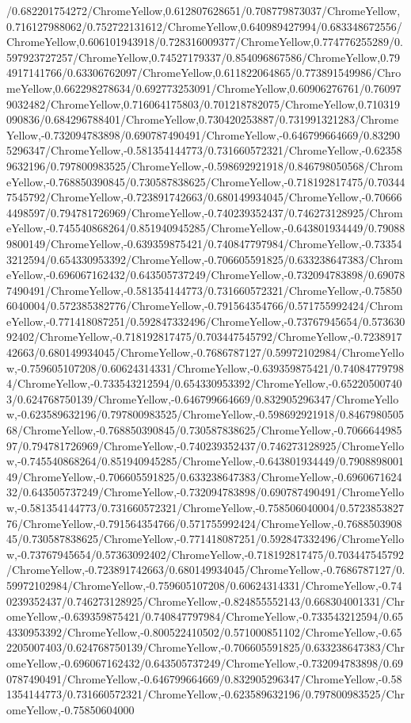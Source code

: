 {\begin{tikzternal}
{/0.682201754272/ChromeYellow,0.612807628651/0.708779873037/ChromeYellow,0.716127988062/0.752722131612/ChromeYellow,0.640989427994/0.683348672556/ChromeYellow,0.606101943918/0.728316009377/ChromeYellow,0.774776255289/0.597923727257/ChromeYellow,0.74527179337/0.854096867586/ChromeYellow,0.794917141766/0.63306762097/ChromeYellow,0.611822064865/0.773891549986/ChromeYellow,0.662298278634/0.692773253091/ChromeYellow,0.60906276761/0.760979032482/ChromeYellow,0.716064175803/0.701218782075/ChromeYellow,0.710319090836/0.684296788401/ChromeYellow,0.730420253887/0.731991321283/ChromeYellow,-0.732094783898/0.690787490491/ChromeYellow,-0.646799664669/0.832905296347/ChromeYellow,-0.581354144773/0.731660572321/ChromeYellow,-0.623589632196/0.797800983525/ChromeYellow,-0.598692921918/0.846798050568/ChromeYellow,-0.768850390845/0.730587838625/ChromeYellow,-0.718192817475/0.703447545792/ChromeYellow,-0.723891742663/0.680149934045/ChromeYellow,-0.706664498597/0.794781726969/ChromeYellow,-0.740239352437/0.746273128925/ChromeYellow,-0.745540868264/0.851940945285/ChromeYellow,-0.643801934449/0.790889800149/ChromeYellow,-0.639359875421/0.740847797984/ChromeYellow,-0.733543212594/0.654330953392/ChromeYellow,-0.706605591825/0.633238647383/ChromeYellow,-0.696067162432/0.643505737249/ChromeYellow,-0.732094783898/0.690787490491/ChromeYellow,-0.581354144773/0.731660572321/ChromeYellow,-0.758506040004/0.572385382776/ChromeYellow,-0.791564354766/0.571755992424/ChromeYellow,-0.771418087251/0.592847332496/ChromeYellow,-0.73767945654/0.57363092402/ChromeYellow,-0.718192817475/0.703447545792/ChromeYellow,-0.723891742663/0.680149934045/ChromeYellow,-0.7686787127/0.59972102984/ChromeYellow,-0.759605107208/0.60624314331/ChromeYellow,-0.639359875421/0.740847797984/ChromeYellow,-0.733543212594/0.654330953392/ChromeYellow,-0.652205007403/0.624768750139/ChromeYellow,-0.646799664669/0.832905296347/ChromeYellow,-0.623589632196/0.797800983525/ChromeYellow,-0.598692921918/0.846798050568/ChromeYellow,-0.768850390845/0.730587838625/ChromeYellow,-0.706664498597/0.794781726969/ChromeYellow,-0.740239352437/0.746273128925/ChromeYellow,-0.745540868264/0.851940945285/ChromeYellow,-0.643801934449/0.790889800149/ChromeYellow,-0.706605591825/0.633238647383/ChromeYellow,-0.696067162432/0.643505737249/ChromeYellow,-0.732094783898/0.690787490491/ChromeYellow,-0.581354144773/0.731660572321/ChromeYellow,-0.758506040004/0.572385382776/ChromeYellow,-0.791564354766/0.571755992424/ChromeYellow,-0.768850390845/0.730587838625/ChromeYellow,-0.771418087251/0.592847332496/ChromeYellow,-0.73767945654/0.57363092402/ChromeYellow,-0.718192817475/0.703447545792/ChromeYellow,-0.723891742663/0.680149934045/ChromeYellow,-0.7686787127/0.59972102984/ChromeYellow,-0.759605107208/0.60624314331/ChromeYellow,-0.740239352437/0.746273128925/ChromeYellow,-0.824855552143/0.668304001331/ChromeYellow,-0.639359875421/0.740847797984/ChromeYellow,-0.733543212594/0.654330953392/ChromeYellow,-0.800522410502/0.571000851102/ChromeYellow,-0.652205007403/0.624768750139/ChromeYellow,-0.706605591825/0.633238647383/ChromeYellow,-0.696067162432/0.643505737249/ChromeYellow,-0.732094783898/0.690787490491/ChromeYellow,-0.646799664669/0.832905296347/ChromeYellow,-0.581354144773/0.731660572321/ChromeYellow,-0.623589632196/0.797800983525/ChromeYellow,-0.75850604000}
\end{tikzternal}}
